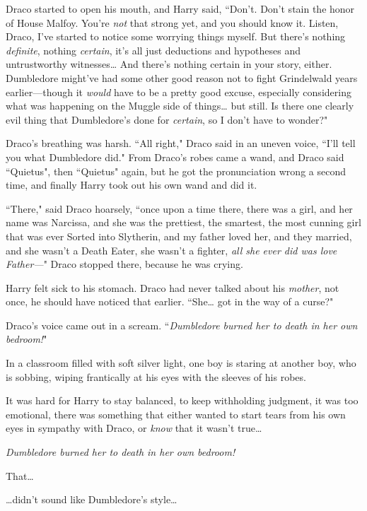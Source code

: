 Draco started to open his mouth, and Harry said, ``Don't. Don't stain the honor of House Malfoy. You're \emph{not} that strong yet, and you should know it. Listen, Draco, I've started to notice some worrying things myself. But there's nothing \emph{definite}, nothing \emph{certain}, it's all just deductions and hypotheses and untrustworthy witnesses{\ldots} And there's nothing certain in your story, either. Dumbledore might've had some other good reason not to fight Grindelwald years earlier—though it \emph{would} have to be a pretty good excuse, especially considering what was happening on the Muggle side of things{\ldots} but still. Is there one clearly evil thing that Dumbledore's done for \emph{certain}, so I don't have to wonder?"

Draco's breathing was harsh. ``All right," Draco said in an uneven voice, ``I'll tell you what Dumbledore did." From Draco's robes came a wand, and Draco said ``Quietus", then ``Quietus" again, but he got the pronunciation wrong a second time, and finally Harry took out his own wand and did it.

``There," said Draco hoarsely, ``once upon a time there, there was a girl, and her name was Narcissa, and she was the prettiest, the smartest, the most cunning girl that was ever Sorted into Slytherin, and my father loved her, and they married, and she wasn't a Death Eater, she wasn't a fighter, \emph{all she ever did was love Father—}" Draco stopped there, because he was crying.

Harry felt sick to his stomach. Draco had never talked about his \emph{mother}, not once, he should have noticed that earlier. ``She{\ldots} got in the way of a curse?"

Draco's voice came out in a scream. ``\emph{Dumbledore burned her to death in her own bedroom!}"

\later

In a classroom filled with soft silver light, one boy is staring at another boy, who is sobbing, wiping frantically at his eyes with the sleeves of his robes.

It was hard for Harry to stay balanced, to keep withholding judgment, it was too emotional, there was something that either wanted to start tears from his own eyes in sympathy with Draco, or \emph{know} that it wasn't true{\ldots}

\emph{Dumbledore burned her to death in her own bedroom!}

That{\ldots}

{\ldots}didn't sound like Dumbledore's style{\ldots}

